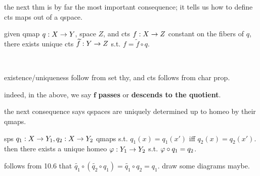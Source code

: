 the next thm is by far the most important consequence; it tells us how to define
cts maps out of a qspace.

\begin{prop}[type=Theorem,title=Passing to the Quotient]
    given qmap $q:X\rightarrow Y$, space $Z$, and cts $f:X\rightarrow Z$ constant on the fibers
    of $q$, there exists unique cts $\widetilde{f}:Y\rightarrow Z$ s.t.
    $f=\tilde{f}\circ q$.
\end{prop} \

\begin{pf}[source=Primary Source Material]
    existence/uniqueness follow from set thy, and cts follows from char prop.
\end{pf}

indeed, in the above, we say $\bm{f}$ \textbf{passes} or \textbf{descends to the
quotient}.

the next consequence says qspaces are uniquely determined up to homeo by their
qmaps.

\begin{prop}[type=Theorem,title=Uniqueness of Quotient Spaces]
    sps $q_{1}:X\rightarrow Y_{1},q_{2}:X\rightarrow Y_{2}$ qmaps s.t. $q_{1}(x)=q_{1}(x')$ iff
    $q_{2}(x)=q_{2}(x')$. then there exists a unique homeo $\varphi:Y_{1}\rightarrow
    Y_{2}$ s.t. $\varphi\circ q_{1}=q_{2}$.
\end{prop}

\begin{pf}[source=Primary Source Material]
    follows from 10.6 that $\tilde{q_{1}}\circ(\tilde{q_{2}}\circ q_{1})
    =\tilde{q_{1}}\circ q_{2}=q_{1}$. draw some diagrams maybe.
\end{pf}

